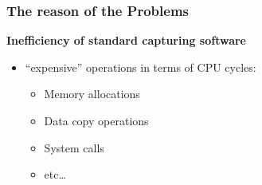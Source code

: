 {
\begin{frame}
\frametitle{The reason of the Problems}

\textbf{Inefficiency of standard capturing software}
\begin{itemize}
	\item ``expensive'' operations in terms of CPU cycles: 
	\begin{itemize}
		\item Memory allocations
		\item Data copy operations
		\item System calls
		\item etc\ldots\newline
	\end{itemize}
\end{itemize}
\end{frame}
}

